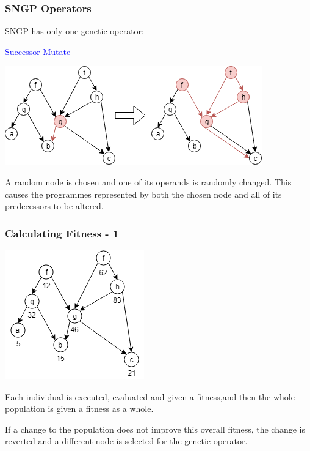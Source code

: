 \documentclass{beamer}
\newcommand{\blue}[1]{\textcolor{blue}{#1}}
\begin{document}
		\begin{frame}
			\frametitle{SNGP Operators}
			
			SNGP has only one genetic operator:
			
			\begin{center}
				
				\blue{Successor Mutate}
				
				\includegraphics[scale=0.5]{resources/10_successor_mutate}
				
				A random node is chosen and one of its operands is randomly changed. This causes the programmes represented by both the chosen node and all of its predecessors to be altered.
				
			\end{center}
			
		\end{frame}
	
		\begin{frame}
			\frametitle{Calculating Fitness - 1}
			
			\begin{center}
			
				\includegraphics[scale=0.5]{resources/11_sngp_fitness}
				
				
			\end{center}
			
			Each individual is executed, evaluated and given a fitness,and then the whole population is given a fitness as a whole. 
			
			If a change to the population does not improve this overall fitness, the change is reverted and a different node is selected for the genetic operator.

		\end{frame}
	
\end{document}
